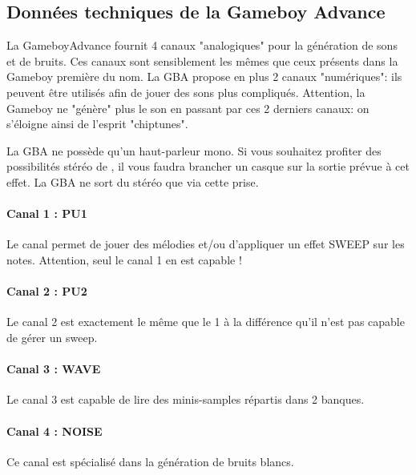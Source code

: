 \documentclass[12pt,a4paper]{article}
\begin{document}
    \subsection{Données techniques de la Gameboy Advance}
    
    La GameboyAdvance fournit 4 canaux "analogiques" pour la génération de sons et de bruits. Ces canaux sont sensiblement les mêmes que ceux présents dans la Gameboy première du nom. La GBA propose en plus 2 canaux "numériques": ils peuvent être utilisés afin de jouer des sons plus compliqués. Attention, la Gameboy ne "génère" plus le son en passant par ces 2 derniers canaux: on s'éloigne ainsi de l'esprit "chiptunes".
    
    La GBA ne possède qu'un haut-parleur mono. Si vous souhaitez profiter des possibilités stéréo de \FAT, il vous faudra brancher un casque sur la sortie prévue à cet effet. La GBA ne sort du stéréo que via cette prise.
    
        \paragraph{Canal 1 : PU1} Le canal permet de jouer des mélodies et/ou d'appliquer un effet SWEEP sur les notes. Attention, seul le canal 1 en est capable ! 
        
        
        \paragraph{Canal 2 : PU2} Le canal 2 est exactement le même que le 1 à la différence qu'il n'est pas capable de gérer un sweep.
        
        
        \paragraph{Canal 3 : WAVE} Le canal 3 est capable de lire des minis-samples répartis dans 2 banques. 
        
        
        \paragraph{Canal 4 : NOISE} Ce canal est spécialisé dans la génération de bruits blancs.
        
\end{document}
